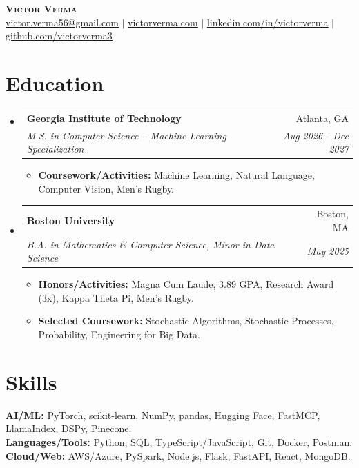 \documentclass[letterpaper,11pt]{article}
\makeatletter
\newcommand{\resumeItem}[1]{
  \item\small{
    {#1 \vspace{-2pt}}
  }
}
\newcommand{\resumeSubheading}[4]{
  \vspace{-2pt}\item
    \begin{tabular*}{0.97\textwidth}[t]{l@{\extracolsep{\fill}}r}
      \textbf{#1} & #2 \\
      \textit{\small#3} & \textit{\small #4} \\
    \end{tabular*}\vspace{-7pt}
}
\newcommand{\resumeSubHeadingListStart}{\begin{itemize}[leftmargin=0.15in, label={}]}
\newcommand{\resumeSubHeadingListEnd}{\end{itemize}}
\newcommand{\resumeItemListStart}{\begin{itemize}}
\newcommand{\resumeItemListEnd}{\end{itemize}\vspace{-5pt}}
\makeatother
\begin{document}
\begin{center}
    \textbf{\Large \scshape Victor Verma} \\ \vspace{1pt}
    \href{mailto:victor.verma56@gmail.com}{\underline{victor.verma56@gmail.com}} $\mid$
    \href{https://www.victorverma.com}{\underline{victorverma.com}} $\mid$ 
    \href{https://linkedin.com/in/victorverma/}{\underline{linkedin.com/in/victorverma}} $\mid$
    \href{https://github.com/victorverma3}{\underline{github.com/victorverma3}}
\end{center}


\section{Education}
  \resumeSubHeadingListStart
    \resumeSubheading
      {Georgia Institute of Technology}{Atlanta, GA}
      {M.S. in Computer Science \--- Machine Learning Specialization}{Aug 2026 \-- Dec 2027}
      \resumeItemListStart
        \resumeItem{\textbf{Coursework/Activities:} Machine Learning, Natural Language, Computer Vision, Men's Rugby.}
      \resumeItemListEnd

    \resumeSubheading
      {Boston University}{Boston, MA}
      {B.A. in Mathematics \& Computer Science, Minor in Data Science}{May 2025}
      \resumeItemListStart
        \resumeItem{\textbf{Honors/Activities:} Magna Cum Laude, 3.89 GPA, Research Award (3x), Kappa Theta Pi, Men’s Rugby.}
        \resumeItem{\textbf{Selected Coursework:} Stochastic Algorithms, Stochastic Processes, Probability, Engineering for Big Data.}
      \resumeItemListEnd
  \resumeSubHeadingListEnd
  
\section{Skills}
 \begin{itemize}[leftmargin=0.15in, label={}]
    \small{\item{
     \textbf{AI/ML:}{ PyTorch, scikit-learn, NumPy, pandas, Hugging Face, FastMCP, LlamaIndex, DSPy, Pinecone.} \\
     \textbf{Languages/Tools:}{ Python, SQL, TypeScript/JavaScript, Git, Docker, Postman.} \\
     \textbf{Cloud/Web:}{ AWS/Azure, PySpark, Node.js, Flask, FastAPI, React, MongoDB.}
    }}
 \end{itemize}
\end{document}
